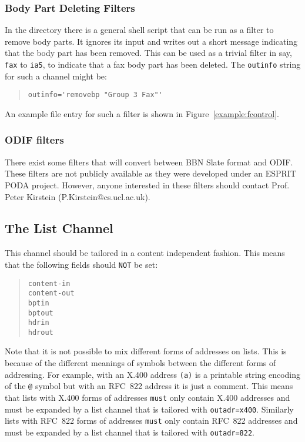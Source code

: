 \subsubsection	{Body Part Deleting Filters}

In the  directory there is a general shell script that
can be run as a filter to remove body parts. It ignores its input and
writes out a short message indicating that the body part has been
removed. This can be used as a trivial filter in say, \verb|fax| to
\verb|ia5|, to indicate that a fax body part has been deleted.
The \verb|outinfo| string for such a channel might be:
\begin{quote}\small\begin{verbatim}
outinfo='removebp "Group 3 Fax"'
\end{verbatim}\end{quote}
An example  file entry for such a filter is shown in
Figure~\ref{example:fcontrol}.

\subsubsection	{ODIF filters}
There exist some filters that will convert between BBN Slate format
and ODIF. These filters are not publicly available as they were
developed under an ESPRIT PODA project. However, anyone interested in
these filters should contact Prof. Peter Kirstein
(P.Kirstein@cs.ucl.ac.uk).

\subsection	{The List Channel}

This channel should be tailored in a content independent fashion.
This means that the following fields should \verb+NOT+ be set:
\begin{quote}\begin{verbatim}
content-in
content-out
bptin
bptout
hdrin
hdrout
\end{verbatim}\end{quote}

Note that it is not possible to mix different forms of addresses on
lists.  This is because of the different meanings of symbols between
the different forms of addressing.  For example, with an X.400 address
\verb+(a)+ is a printable string encoding of the \verb+@+ symbol but
with an RFC~822 address it is just a comment.  This means that lists
with X.400 forms of addresses \verb+must+ only contain X.400 addresses
and must be expanded by a list channel that is tailored with
\verb+outadr=x400+.  Similarly lists with RFC~822 forms of addresses
\verb+must+ only contain RFC~822 addresses and must be expanded by a
list channel that is tailored with \verb+outadr=822+.


